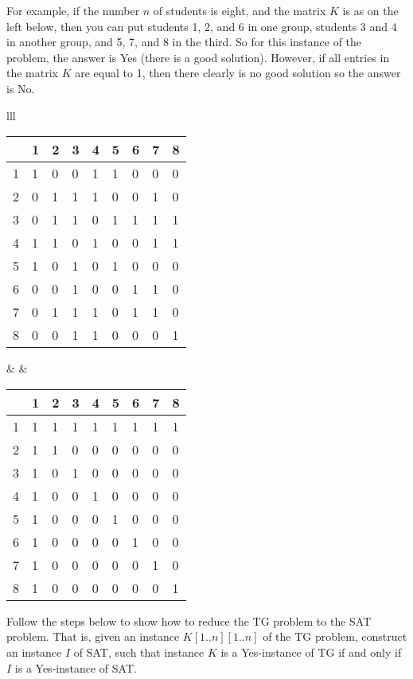 \documentclass[11pt,fleqn]{exam}
\begin{document}
For example, if the number $n$ of students is eight, and the matrix $K$ is as on the left below, then you can put students 1, 2, and 6 in one group, students 3 and 4 in another group, and 5, 7, and 8 in the third. So for this instance of the problem, the answer is Yes (there is a good solution). However, if all entries in the matrix $K$ are equal to 1, then there clearly is no good solution so the answer is No.

\begin{center}
  \begin{tabular}{lll}
    \begin{tabular}{l|llllllll}
        & 1 & 2 & 3 & 4 & 5 & 6 & 7 & 8 \\ \hline
      1 & 1 & 0 & 0 & 1 & 1 & 0 & 0 & 0 \\
      2 & 0 & 1 & 1 & 1 & 0 & 0 & 1 & 0 \\
      3 & 0 & 1 & 1 & 0 & 1 & 1 & 1 & 1 \\
      4 & 1 & 1 & 0 & 1 & 0 & 0 & 1 & 1 \\
      5 & 1 & 0 & 1 & 0 & 1 & 0 & 0 & 0 \\
      6 & 0 & 0 & 1 & 0 & 0 & 1 & 1 & 0 \\
      7 & 0 & 1 & 1 & 1 & 0 & 1 & 1 & 0 \\
      8 & 0 & 0 & 1 & 1 & 0 & 0 & 0 & 1
    \end{tabular}
      &
    \hspace{.5in}
      &
    \begin{tabular}{l|llllllll}
        & 1 & 2 & 3 & 4 & 5 & 6 & 7 & 8 \\ \hline
      1 & 1 & 1 & 1 & 1 & 1 & 1 & 1 & 1 \\
      2 & 1 & 1 & 0 & 0 & 0 & 0 & 0 & 0 \\
      3 & 1 & 0 & 1 & 0 & 0 & 0 & 0 & 0 \\
      4 & 1 & 0 & 0 & 1 & 0 & 0 & 0 & 0 \\
      5 & 1 & 0 & 0 & 0 & 1 & 0 & 0 & 0 \\
      6 & 1 & 0 & 0 & 0 & 0 & 1 & 0 & 0 \\
      7 & 1 & 0 & 0 & 0 & 0 & 0 & 1 & 0 \\
      8 & 1 & 0 & 0 & 0 & 0 & 0 & 0 & 1 \\
    \end{tabular}
  \end{tabular}
\end{center}

Follow the steps below to show how to reduce the TG problem to the SAT problem. That is, given an instance $K[1..n][1..n]$ of the TG problem, construct an instance $I$ of SAT, such that
instance $K$ is a Yes-instance of TG if and only if $I$ is a Yes-instance of SAT.
\end{document}
